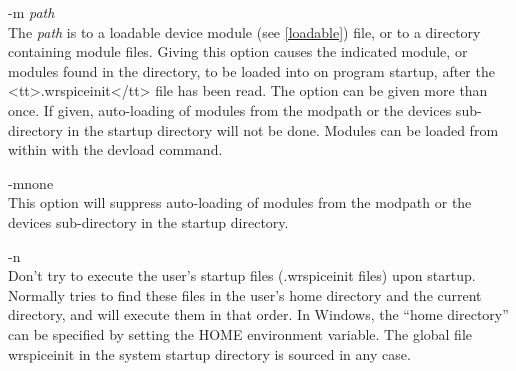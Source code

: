 \begin{description}
%

\item{\vt -m} {\it path}\\
The {\it path} is to a loadable device module (see \ref{loadable})
file, or to a directory containing module files.  Giving this option
causes the indicated module, or modules found in the directory, to be
loaded into {\WRspice} on program startup, after the
<tt>.wrspiceinit</tt> file has been read.  The option can be given
more than once.  If given, auto-loading of modules from the {\et
modpath} or the {\vt devices} sub-directory in the {\vt startup}
directory will not be done.  Modules can be loaded from within
{\WRspice} with the {\cb devload} command.

\item{\vt -mnone}\\
This option will suppress auto-loading of modules from the {\et
modpath} or the {\vt devices} sub-directory in the {\vt startup}
directory.

\item{\vt -n}\\
Don't try to execute the user's startup files ({\vt .wrspiceinit}
files) upon startup.  Normally {\WRspice} tries to find these files in
the user's home directory and the current directory, and will execute
them in that order.  In Windows, the ``home directory'' can be
specified by setting the {\et HOME} environment variable.  The global
file {\vt wrspiceinit} in the system startup directory is sourced in
any case.


\end{description}
